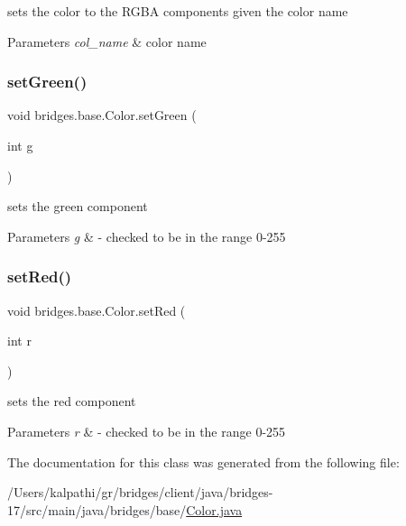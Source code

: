 sets the color to the R\+G\+BA components given the color name


\begin{DoxyParams}{Parameters}
{\em col\+\_\+name} & color name \\
\hline
\end{DoxyParams}
\mbox{\label{classbridges_1_1base_1_1_color_a415a28133ade4e216c02ecdfc8a32a1d}} 
\subsubsection{\texorpdfstring{set\+Green()}{setGreen()}}
{\footnotesize\ttfamily void bridges.\+base.\+Color.\+set\+Green (\begin{DoxyParamCaption}\item[{int}]{g }\end{DoxyParamCaption})}

sets the green component


\begin{DoxyParams}{Parameters}
{\em g} & -\/ checked to be in the range 0-\/255 \\
\hline
\end{DoxyParams}
\mbox{\label{classbridges_1_1base_1_1_color_a1d78967703924b709e76def5b2b3ee9a}} 
\subsubsection{\texorpdfstring{set\+Red()}{setRed()}}
{\footnotesize\ttfamily void bridges.\+base.\+Color.\+set\+Red (\begin{DoxyParamCaption}\item[{int}]{r }\end{DoxyParamCaption})}

sets the red component


\begin{DoxyParams}{Parameters}
{\em r} & -\/ checked to be in the range 0-\/255 \\
\hline
\end{DoxyParams}


The documentation for this class was generated from the following file\+:\begin{DoxyCompactItemize}
\item 
/\+Users/kalpathi/gr/bridges/client/java/bridges-\/17/src/main/java/bridges/base/\mbox{\hyperlink{_color_8java}{Color.\+java}}\end{DoxyCompactItemize}
